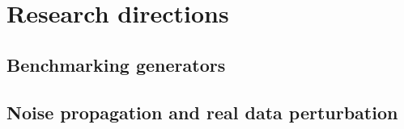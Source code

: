 \documentclass[english,11pt]{beamer}
\newcommand{\sframe}[2]{\frame{\frametitle{#1} #2}}
\begin{document}
\section{Research directions}


\subsection{Benchmarking generators}


\sframe{}{

}




\subsection{Noise propagation and real data perturbation}



\end{document}
